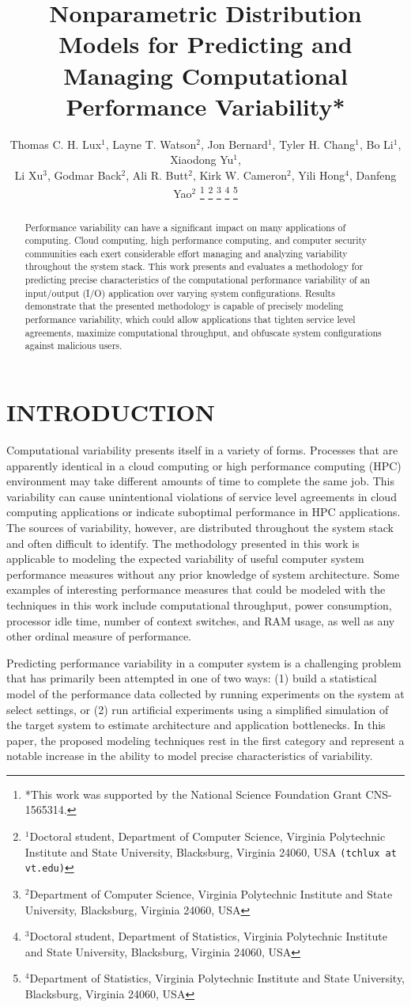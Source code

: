 \documentclass[letterpaper, 10 pt, conference]{ieeeconf}  %
\title{\LARGE \bf Nonparametric Distribution Models for Predicting and
  \\ Managing Computational Performance Variability* }
\author{Thomas C. H. Lux$^{1}$, Layne T. Watson$^{2}$, Jon Bernard$^{1}$, Tyler H. Chang$^{1}$, Bo Li$^{1}$, Xiaodong Yu$^{1}$,\\ Li Xu$^{3}$, Godmar Back$^{2}$, Ali R. Butt$^{2}$, Kirk W. Cameron$^{2}$, Yili Hong$^{4}$, Danfeng Yao$^{2}$%
\thanks{*This work was supported by the National Science Foundation Grant CNS-1565314.}%
\thanks{$^{1}$Doctoral student, Department of Computer Science, Virginia Polytechnic Institute and State University, Blacksburg, Virginia 24060, USA {\tt\small (tchlux at vt.edu)}}%
\thanks{$^{2}$Department of Computer Science, Virginia Polytechnic Institute and State University, Blacksburg, Virginia 24060, USA}%
\thanks{$^{3}$Doctoral student, Department of Statistics, Virginia Polytechnic Institute and State University, Blacksburg, Virginia 24060, USA}%
\thanks{$^{4}$Department of Statistics, Virginia Polytechnic Institute and State University, Blacksburg, Virginia 24060, USA}%
}
\begin{document}
\maketitle
\thispagestyle{empty}
\pagestyle{empty}

\begin{abstract}
Performance variability can have a significant impact on many applications of computing. Cloud computing, high performance computing, and computer security communities each exert considerable effort managing and analyzing variability throughout the system stack. This work presents and evaluates a methodology for predicting precise characteristics of the computational performance variability of an input/output (I/O) application over varying system configurations. Results demonstrate that the presented methodology is capable of precisely modeling performance variability, which could allow applications that tighten service level agreements, maximize computational throughput, and obfuscate system configurations against malicious users.
\end{abstract}

\section{INTRODUCTION}
\label{sec:introduction}

Computational variability presents itself in a variety of forms. Processes that are apparently identical in a cloud computing or high performance computing (HPC) environment may take different amounts of time to complete the same job. This variability can cause unintentional violations of service level agreements in cloud computing applications or indicate suboptimal performance in HPC applications. The sources of variability, however, are distributed throughout the system stack and often difficult to identify. The methodology presented in this work is applicable to modeling the expected variability of useful computer system performance measures without any prior knowledge of system architecture. Some examples of interesting performance measures that could be modeled with the techniques in this work include computational throughput, power consumption, processor idle time, number of context switches, and RAM usage, as well as any other ordinal measure of performance.

Predicting performance variability in a computer system is a challenging problem that has primarily been attempted in one of two ways: (1) build a statistical model of the performance data collected by running experiments on the system at select settings, or (2) run artificial experiments using a simplified simulation of the target system to estimate architecture and application bottlenecks. In this paper, the proposed modeling techniques rest in the first category and represent a notable increase in the ability to model precise characteristics of variability.
\end{document}
